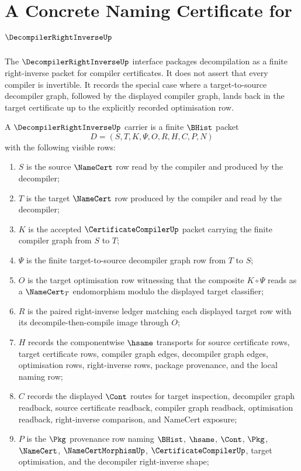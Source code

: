 \chapter{A Concrete Naming Certificate for $\DecompilerRightInverseUp$}
\label{ch:concrete-instances-decompiler-right-inverse-namecert}

The $\DecompilerRightInverseUp$ interface packages decompilation as a finite
right-inverse packet for compiler certificates. It does not assert that every
compiler is invertible. It records the special case where a target-to-source
decompiler graph, followed by the displayed compiler graph, lands back in the
target certificate up to the explicitly recorded optimisation row.

\begin{definition}
\label{def:decompiler-right-inverse-carrier}
A $\DecompilerRightInverseUp$ carrier is a finite $\BHist$ packet
$$
D=(S,T,K,\Psi,O,R,H,C,P,N)
$$
with the following visible rows:
\begin{enumerate}
\item $S$ is the source $\NameCert$ row read by the compiler and produced by the decompiler;
\item $T$ is the target $\NameCert$ row produced by the compiler and read by the decompiler;
\item $K$ is the accepted $\CertificateCompilerUp$ packet carrying the finite compiler graph from $S$ to $T$;
\item $\Psi$ is the finite target-to-source decompiler graph row from $T$ to $S$;
\item $O$ is the target optimisation row witnessing that the composite $K\circ\Psi$ reads as a $\NameCert_T$ endomorphism modulo the displayed target classifier;
\item $R$ is the paired right-inverse ledger matching each displayed target row with its decompile-then-compile image through $O$;
\item $H$ records the componentwise $\hsame$ transports for source certificate rows, target certificate rows, compiler graph edges, decompiler graph edges, optimisation rows, right-inverse rows, package provenance, and the local naming row;
\item $C$ records the displayed $\Cont$ routes for target inspection, decompiler graph readback, source certificate readback, compiler graph readback, optimisation readback, right-inverse comparison, and NameCert exposure;
\item $P$ is the $\Pkg$ provenance row naming $\BHist$, $\hsame$, $\Cont$, $\Pkg$, $\NameCert$, $\NameCertMorphismUp$, $\CertificateCompilerUp$, target optimisation, and the decompiler right-inverse shape;

\end{enumerate}
\end{definition}
